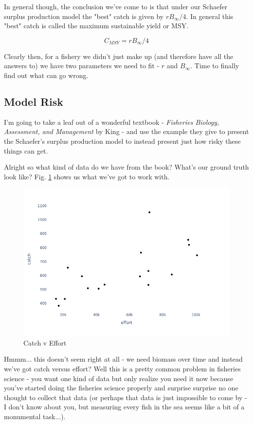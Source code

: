 \documentclass[11pt,a5paper]{book}
\begin{document}
In general though, the conclusion we've come to is that under our Schaefer surplus production model the "best" catch is given by $rB_\infty / 4$. In general this "best" catch is called the maximum sustainable yield or MSY. 

$$C_{MSY} = rB_\infty /4$$

Clearly then, for a fishery we didn't just make up (and therefore have all the answers to) we have two parameters we need to fit - $r$ and $B_\infty$. Time to finally find out what can go wrong.

\subsection{Model Risk}

I'm going to take a leaf out of a wonderful textbook - \textit{Fisheries Biology, Assessment, and Management} by King - and use the example they give to present the Schaefer's surplus production model to instead present just how risky these things can get. 
\newline

Alright so what kind of data do we have from the book? What's our ground truth look like? Fig. \ref{fig:catch_v_effort} shows us what we've got to work with. 
\newline

\begin{figure}[h!] 
  \includegraphics[width=\linewidth]{notebooks/SurplusModels/measurements.png}
  \caption{Catch v Effort}
  \label{fig:catch_v_effort}
\end{figure}

Hmmm... this doesn't seem right at all - we need biomass over time and instead we've got catch versus effort? Well this is a pretty common problem in fisheries science - you want one kind of data but only realize you need it now because you've started doing the fisheries science properly and surprise surprise no one thought to collect that data (or perhaps that data is just impossible to come by - I don't know about you, but measuring every fish in the sea seems like a bit of a monumental task...). 
\newline
\end{document}
